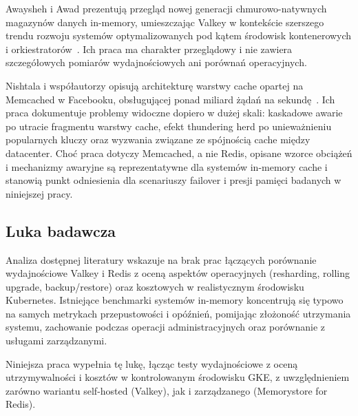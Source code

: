 Awaysheh i Awad prezentują przegląd nowej generacji chmurowo-natywnych magazynów danych in-memory, umieszczając Valkey w kontekście szerszego trendu rozwoju systemów optymalizowanych pod kątem środowisk kontenerowych i orkiestratorów~\cite{awaysheh2025}. Ich praca ma charakter przeglądowy i nie zawiera szczegółowych pomiarów wydajnościowych ani porównań operacyjnych.

Nishtala i współautorzy opisują architekturę warstwy cache opartej na Memcached w Facebooku, obsługującej ponad miliard żądań na sekundę~\cite{nishtala2013}. Ich praca dokumentuje problemy widoczne dopiero w dużej skali: kaskadowe awarie po utracie fragmentu warstwy cache, efekt thundering herd po unieważnieniu popularnych kluczy oraz wyzwania związane ze spójnością cache między datacenter. Choć praca dotyczy Memcached, a nie Redis, opisane wzorce obciążeń i mechanizmy awaryjne są reprezentatywne dla systemów in-memory cache i stanowią punkt odniesienia dla scenariuszy failover i presji pamięci badanych w niniejszej pracy.

\subsection{Luka badawcza}

Analiza dostępnej literatury wskazuje na brak prac łączących porównanie wydajnościowe Valkey i Redis z oceną aspektów operacyjnych (resharding, rolling upgrade, backup/restore) oraz kosztowych w realistycznym środowisku Kubernetes. Istniejące benchmarki systemów in-memory koncentrują się typowo na samych metrykach przepustowości i opóźnień, pomijając złożoność utrzymania systemu, zachowanie podczas operacji administracyjnych oraz porównanie z usługami zarządzanymi.

Niniejsza praca wypełnia tę lukę, łącząc testy wydajnościowe z oceną utrzymywalności i kosztów w kontrolowanym środowisku GKE, z uwzględnieniem zarówno wariantu self-hosted (Valkey), jak i zarządzanego (Memorystore for Redis).
